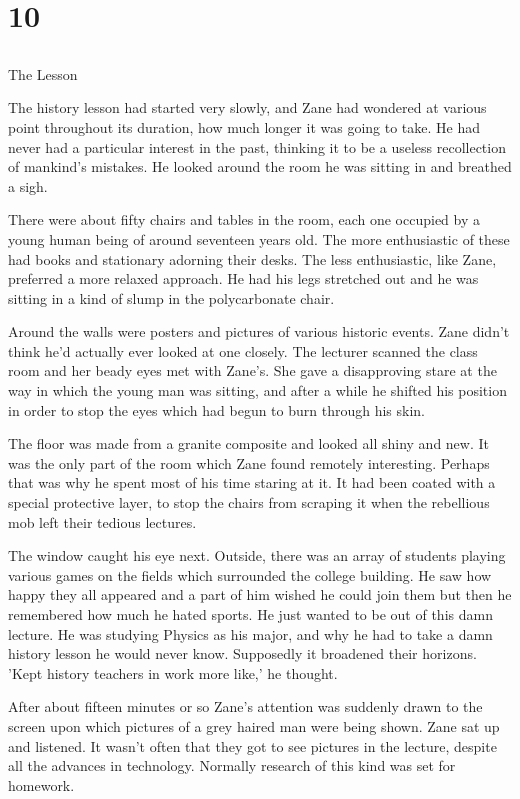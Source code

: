 \chapter{10}
\section{}
The Lesson  

The history lesson had started very slowly, and Zane had wondered at various point throughout its duration, how much longer it was going to take.  He had never had a particular interest in the past, thinking it to be a useless recollection of mankind's mistakes.   He looked around the room he was sitting in and breathed a sigh.

There were about fifty chairs and tables in the room, each one occupied by a young human being of around seventeen years old.  The more enthusiastic of these had books and stationary adorning their desks.  The less enthusiastic, like Zane, preferred a more relaxed approach.  He had his legs stretched out and he was sitting in a kind of slump in the polycarbonate chair.

Around the walls were posters and pictures of various historic events.  Zane didn't think he'd actually ever looked at one closely.  The lecturer scanned the class room and her beady eyes met with Zane's.  She gave a disapproving stare at the way in which the young man was sitting, and after a while he shifted his position in order to stop the eyes which had begun to burn through his skin.

The floor was made from a granite composite and looked all shiny and new.  It was the only part of the room which Zane found remotely interesting.  Perhaps that was why he spent most of his time staring at it.  It had been coated with a special protective layer, to stop the chairs from scraping it when the rebellious mob left their tedious lectures.

The window caught his eye next.  Outside, there was an array of students playing various games on the fields which surrounded the college building.  He saw how happy they all appeared and a part of him wished he could join them but then he remembered how much he hated sports.  He just wanted to be out of this damn lecture.  He was studying Physics as his major, and why he had to take a damn history lesson he would never know.  Supposedly it broadened their horizons.  'Kept history teachers in work more like,' he thought.

After about fifteen minutes or so Zane's attention was suddenly drawn to the screen upon which pictures of a grey haired man were being shown.  Zane sat up and listened.  It wasn't often that they got to see pictures in the lecture, despite all the advances in technology.  Normally research of this kind was set for homework.  

